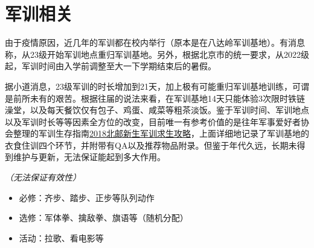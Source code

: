 \section{军训相关}


由于疫情原因，近几年的军训都在校内举行（原本是在八达岭军训基地）。有消息称，从23级开始军训地点重归军训基地。另外，根据北京市的统一要求，从2022级起，军训时间由入学前调整至大一下学期结束后的暑假。


据小道消息，23级军训的时长增加到21天，加上极有可能重归军训基地训练，可谓是前所未有的艰苦。根据往届的说法来看，在军训基地14天只能体验3次限时铁链澡堂，以及每天餐饮仅有包子、鸡蛋、咸菜等粗茶淡饭。鉴于军训时间、军训地点以及军训时长等等因素全方位的改变，目前唯一有参考价值的是往年军事爱好者协会整理的军训生存指南\href{https://shimo.im/docs/473QMD0rGVc6MV3w/}{2018北邮新生军训求生攻略}，上面详细地记录了军训基地的衣食住训四个环节，并附带有QA以及推荐物品附录。但鉴于年代久远，长期未得到维护与更新，无法保证能起到多大作用。


\emph{（无法保证有效性）}
\begin{itemize}
    \item 必修：齐步、踏步、正步等队列动作
    \item 选修：军体拳、擒敌拳、旗语等（随机分配）
    \item 活动：拉歌、看电影等
\end{itemize}
